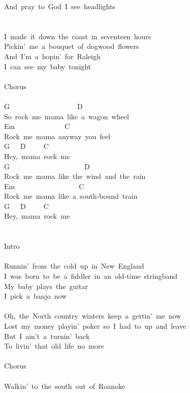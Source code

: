 \documentclass[]{book}
\begin{document}
And~pray~to~God~I~see~headlights\\
~\\
~\\
I~made~it~down~the~coast~in~seventeen~hours~\\
Pickin'~me~a~bouquet~of~dogwood~flowers~\\
And~I'm~a~hopin'~for~Raleigh~\\
I~can~see~my~baby~tonight\\
~\\
Chorus\\
~\\
\hspace*{0.333em}\hspace*{0.333em}\hspace*{0.333em}G~~~~~~~~~~~~~~~~~~~D\\
So~rock~me~mama~like~a~wagon~wheel\\
Em~~~~~~~~~~~~~~C\\
Rock~me~mama~anyway~you~feel\\
G~~~D~~~~~C\\
Hey,~mama~rock~me\\
G~~~~~~~~~~~~~~~~~~~~~D\\
Rock~me~mama~like~the~wind~and~the~rain\\
Em~~~~~~~~~~~~~~~~~~C\\
Rock~me~mama~like~a~south-bound~train\\
G~~~D~~~~~C\\
Hey,~mama~rock~me\\
~\\
~\\
Intro\\
~\\
Runnin'~from~the~cold~up~in~New~England\\
I~was~born~to~be~a~fiddler~in~an~old-time~stringband\\
My~baby~plays~the~guitar\\
I~pick~a~banjo~now\\
~\\
Oh,~the~North~country~winters~keep~a~gettin'~me~now\\
Lost~my~money~playin'~poker~so~I~had~to~up~and~leave\\
But~I~ain't~a~turnin'~back\\
To~livin'~that~old~life~no~more\\
~\\
Chorus\\
~\\
Walkin'~to~the~south~out~of~Roanoke\\
\end{document}
